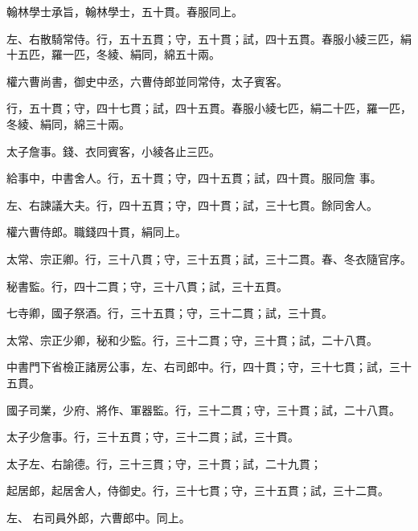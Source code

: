 \begin{pinyinscope}
 翰林學士承旨，翰林學士，五十貫。春服同上。



 左、右散騎常侍。行，五十五貫；守，五十貫；試，四十五貫。春服小綾三匹，絹十五匹，羅一匹，冬綾、絹同，綿五十兩。



 權六曹尚書，御史中丞，六曹侍郎並同常侍，太子賓客。



 行，五十貫；守，四十七貫；試，四十五貫。春服小綾七匹，絹二十匹，羅一匹，冬綾、絹同，綿三十兩。



 太子詹事。錢、衣同賓客，小綾各止三匹。



 給事中，中書舍人。行，五十貫；守，四十五貫；試，四十貫。服同詹
 事。



 左、右諫議大夫。行，四十五貫；守，四十貫；試，三十七貫。餘同舍人。



 權六曹侍郎。職錢四十貫，絹同上。



 太常、宗正卿。行，三十八貫；守，三十五貫；試，三十二貫。春、冬衣隨官序。



 秘書監。行，四十二貫；守，三十八貫；試，三十五貫。



 七寺卿，國子祭酒。行，三十五貫；守，三十二貫；試，三十貫。



 太常、宗正少卿，秘和少監。行，三十二貫；守，三十貫；試，二十八貫。



 中書門下省檢正諸房公事，左、右司郎中。行，四十貫；守，三十七貫；試，三十五貫。



 國子司業，少府、將作、軍器監。行，三十二貫；守，三十貫；試，二十八貫。



 太子少詹事。行，三十五貫；守，三十二貫；試，三十貫。



 太子左、右諭德。行，三十三貫；守，三十貫；試，二十九貫；



 起居郎，起居舍人，侍御史。行，三十七貫；守，三十五貫；試，三十二貫。



 左、
 右司員外郎，六曹郎中。同上。




\end{pinyinscope}
